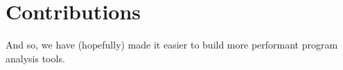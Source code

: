 \chapter{Contributions}

And so, we have (hopefully) made it easier to build more performant program
analysis tools.
